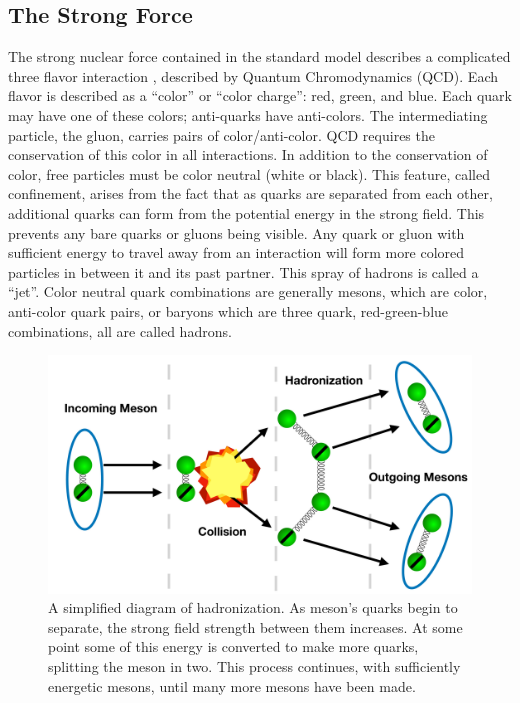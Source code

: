 \subsection{The Strong Force}
The strong nuclear force contained in the standard model describes a complicated three flavor interaction \SUthree, described by Quantum Chromodynamics (QCD). Each flavor is described as a ``color'' or ``color charge'': red, green, and blue. Each quark may have one of these colors; anti-quarks have anti-colors. The intermediating particle, the gluon, carries pairs of color/anti-color. QCD requires the conservation of this color in all interactions. In addition to the conservation of color, free particles must be color neutral (white or black). This feature, called confinement, arises from the fact that as quarks are separated from each other, additional quarks can form from the potential energy in the strong field. This prevents any bare quarks or gluons being visible. Any quark or gluon with sufficient energy to travel away from an interaction will form more colored particles in between it and its past partner. This spray of hadrons is called a ``jet''. Color neutral quark combinations are generally mesons, which are color, anti-color quark pairs, or baryons which are three quark, red-green-blue combinations, all are called hadrons.
\begin{figure}[!btp]
    \centering
    \includegraphics[width=\textwidth]{figures/hadronization.pdf}
    \caption[Hadronization of a meson.]
       {A simplified diagram of hadronization.  As meson's quarks begin to separate, the strong field strength between them increases. At some point some of this energy is converted to make more quarks, splitting the meson in two.  This process continues, with sufficiently energetic mesons, until many more mesons have been made.}
    \label{fig:hadronization}
\end{figure}

